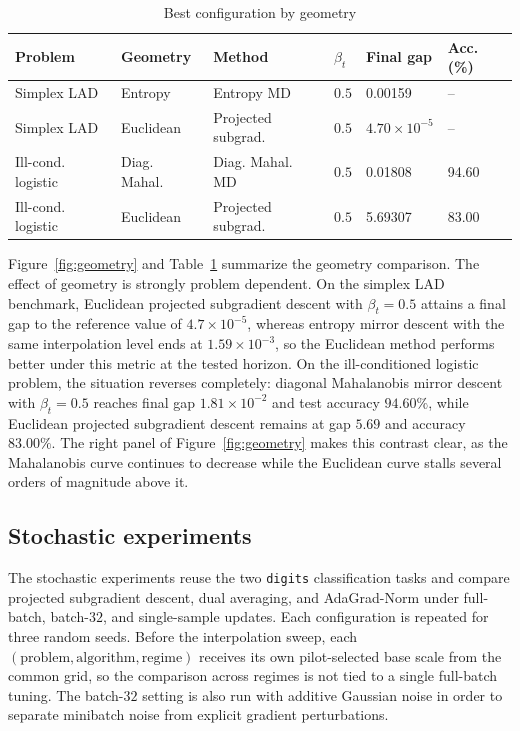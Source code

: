 \documentclass[11pt]{article}
\theoremstyle{definition}
\theoremstyle{remark}
\begin{document}
\begin{table}[H]
    \centering
    \caption{Best configuration by geometry}
    \label{tab:geometry}
    \small
    \begin{tabular}{llllll}
        \toprule
        Problem & Geometry & Method & $\beta_t$ & Final gap & Acc. (\%) \\
        \midrule
        Simplex LAD & Entropy & Entropy MD & $0.5$ & 0.00159 & -- \\
        Simplex LAD & Euclidean & Projected subgrad. & $0.5$ & $4.70\times 10^{-5}$ & -- \\
        Ill-cond. logistic & Diag. Mahal. & Diag. Mahal. MD & $0.5$ & 0.01808 & 94.60 \\
        Ill-cond. logistic & Euclidean & Projected subgrad. & $0.5$ & 5.69307 & 83.00 \\
        \bottomrule
    \end{tabular}
\end{table}
Figure~\ref{fig:geometry} and Table~\ref{tab:geometry} summarize the geometry comparison. The effect of geometry is strongly problem dependent. On the simplex LAD benchmark, Euclidean projected subgradient descent with $\beta_t=0.5$ attains a final gap to the reference value of $4.7\times 10^{-5}$, whereas entropy mirror descent with the same interpolation level ends at $1.59\times 10^{-3}$, so the Euclidean method performs better under this metric at the tested horizon. On the ill-conditioned logistic problem, the situation reverses completely: diagonal Mahalanobis mirror descent with $\beta_t=0.5$ reaches final gap $1.81\times 10^{-2}$ and test accuracy $94.60\%$, while Euclidean projected subgradient descent remains at gap $5.69$ and accuracy $83.00\%$. The right panel of Figure~\ref{fig:geometry} makes this contrast clear, as the Mahalanobis curve continues to decrease while the Euclidean curve stalls several orders of magnitude above it.

\subsection{Stochastic experiments}
The stochastic experiments reuse the two \texttt{digits} classification tasks and compare projected subgradient descent, dual averaging, and AdaGrad-Norm under full-batch, batch-$32$, and single-sample updates. Each configuration is repeated for three random seeds. Before the interpolation sweep, each $(\text{problem}, \text{algorithm}, \text{regime})$ receives its own pilot-selected base scale from the common grid, so the comparison across regimes is not tied to a single full-batch tuning. The batch-$32$ setting is also run with additive Gaussian noise in order to separate minibatch noise from explicit gradient perturbations.
\end{document}
